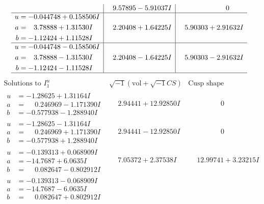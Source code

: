 \documentclass[1p]{elsarticle_modified}
\theoremstyle{definition}
\newcommand{\I}{\sqrt{-1}}
\begin{document}
$$\begin{array}{c|c|c}
 & \phantom{-}9.57895 - 5.91037 I & \phantom{-0.000000 } 0 \\ \hline\begin{aligned}
u &= -0.044748 + 0.158506 I \\
a &= \phantom{-}3.78888 + 1.31530 I \\
b &= -1.12424 + 1.11528 I\end{aligned}
 & \phantom{-}2.20408 + 1.64225 I & \phantom{-}5.90303 + 2.91632 I \\ \hline\begin{aligned}
u &= -0.044748 - 0.158506 I \\
a &= \phantom{-}3.78888 - 1.31530 I \\
b &= -1.12424 - 1.11528 I\end{aligned}
 & \phantom{-}2.20408 - 1.64225 I & \phantom{-}5.90303 - 2.91632 I\\
 \hline 
 \end{array}$$\newpage$$\begin{array}{c|c|c}  
\text{Solutions to }I^u_{1}& \I (\text{vol} + \sqrt{-1}CS) & \text{Cusp shape}\\
 \hline 
\begin{aligned}
u &= -1.28625 + 1.31164 I \\
a &= \phantom{-}0.246969 - 1.171390 I \\
b &= -0.577938 - 1.288940 I\end{aligned}
 & \phantom{-}2.94441 + 12.92850 I & \phantom{-0.000000 } 0 \\ \hline\begin{aligned}
u &= -1.28625 - 1.31164 I \\
a &= \phantom{-}0.246969 + 1.171390 I \\
b &= -0.577938 + 1.288940 I\end{aligned}
 & \phantom{-}2.94441 - 12.92850 I & \phantom{-0.000000 } 0 \\ \hline\begin{aligned}
u &= -0.139313 + 0.068909 I \\
a &= -14.7687 + 6.0635 I \\
b &= \phantom{-}0.082647 - 0.802912 I\end{aligned}
 & \phantom{-}7.05372 + 2.37538 I & \phantom{-}12.99741 + 3.23215 I \\ \hline\begin{aligned}
u &= -0.139313 - 0.068909 I \\
a &= -14.7687 - 6.0635 I \\
b &= \phantom{-}0.082647 + 0.802912 I\end{aligned}

\end{array}$$
\end{document}
